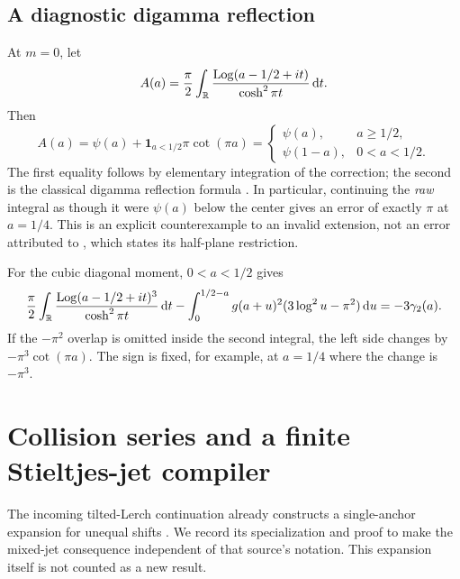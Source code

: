 \documentclass[11pt,letterpaper]{article}
\theoremstyle{definition}\newtheorem{definition}[theorem]{Definition}
\theoremstyle{remark}\newtheorem{remark}[theorem]{Remark}
\newcommand{\dd}{\,\mathrm d}\newcommand{\M}{\mathcal M}
\begin{document}
\subsection{A diagnostic digamma reflection}
At $m=0$, let
\begin{equation}\label{mr:eq:rawlog}
 A(a)=\frac\pi2\int_\R\frac{\Log(a-1/2+it)}{\cosh^2\pi t}\dd t.
\end{equation}
Then
\begin{equation}\label{mr:eq:digamma}
 A(a)=\psi(a)+\mathbf1_{a<1/2}\pi\cot(\pi a)
 =\begin{cases}\psi(a),&a\ge1/2,\\\psi(1-a),&0<a<1/2.\end{cases}
\end{equation}
The first equality follows by elementary integration of the correction;
the second is the classical digamma reflection formula \cite{Polygamma}.
In particular, continuing the \emph{raw} integral as though it were
$\psi(a)$ below the center gives an error of exactly $\pi$ at $a=1/4$.
This is an explicit counterexample to an invalid extension, not an error
attributed to \cite{JB}, which states its half-plane restriction.

For the cubic diagonal moment, $0<a<1/2$ gives
\begin{equation}\label{mr:eq:cubicdiag}
 \frac\pi2\int_\R\frac{\Log(a-1/2+it)^3}{\cosh^2\pi t}\dd t
 -\int_0^{1/2-a}g(a+u)^2(3\log^2u-\pi^2)\dd u
 =-3\gamma_2(a).
\end{equation}
If the $-\pi^2$ overlap is omitted inside the second integral, the
left side changes by $-\pi^3\cot(\pi a)$. The sign is fixed, for
example, at $a=1/4$ where the change is $-\pi^3$.

\section{Collision series and a finite Stieltjes-jet compiler}
\label{mr:sec:compiler}
The incoming tilted-Lerch continuation already constructs a single-anchor
expansion for unequal shifts \cite{Tilt}. We record its specialization
and proof to make the mixed-jet consequence independent of that source's
notation. This expansion itself is not counted as a new result.
\end{document}
